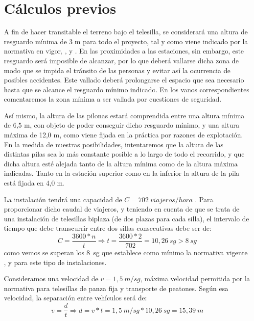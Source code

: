 \documentclass[a4paper,11pt]{article}
\begin{document}
\part{Cálculos previos}
A fin de hacer transitable el terreno bajo el telesilla, se considerará una altura de resguardo mínima de 3 m para todo el proyecto, tal y como viene indicado por la normativa en vigor, \cite{BOE2002a}, \cite{Europea2016} y \cite{Europea2018}. En las proximidades a las estaciones, sin embargo, este resguardo será imposible de alcanzar, por lo que deberá vallarse dicha zona de modo que se impida el tránsito de las personas y evitar así la ocurrencia de posibles accidentes. Este vallado deberá prolongarse el espacio que sea necesario hasta que se alcance el resguardo mínimo indicado. En los vanos correspondientes comentaremos la zona mínima a ser vallada por cuestiones de seguridad.\\
\par Así mismo, la altura de las pilonas estará comprendida entre una altura mínima de 6,5 m, con objeto de poder conseguir dicho resguardo mínimo, y una altura máxima de 12,0 m, como viene fijada en la práctica por razones de explotación. En la medida de nuestras posibilidades, intentaremos que la altura de las distintas pilas sea lo más constante posible a lo largo de todo el recorrido, y que dicha altura esté alejada tanto de la altura mínima como de la altura máxima indicadas. Tanto en la estación superior como en la inferior la altura de la pila está fijada en 4,0 m.\\
\par La instalación tendrá una capacidad de $C = 702~viajeros/hora$ . Para proporcionar dicho caudal de viajeros, y teniendo en cuenta de que se trata de una instalación de telesillas biplaza (de dos plazas para cada silla), el intervalo de tiempo que debe transcurrir entre dos sillas consecutivas debe ser de:
\begin{displaymath}
C=\frac{3600*n}{t} \Rightarrow t=\frac{3600*2}{702} = 10,26~sg > 8~sg
\end{displaymath}
como vemos se superan los 8~sg que establece como mínimo la normativa vigente \cite{BOE2002a}, \cite{Europea2016} y \cite{Europea2018} para este tipo de instalaciones.\\
\par Consideramos una velocidad de $v = 1,5~m/sg$, máxima velocidad permitida por la normativa para telesillas de panza fija y transporte de peatones. Según esa velocidad, la separación entre vehículos será de:
\begin{displaymath}
v=\frac{d}{t} \Rightarrow d=v*t = 1,5~m/sg * 10,26~sg = 15,39~m 
\end{displaymath}
\end{document}
